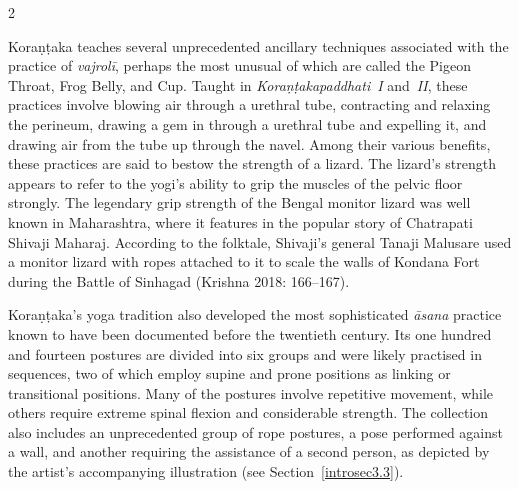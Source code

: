 \begin{nohyp}
\begin{multicols*}{2}
\begin{eng}
Koraṇṭaka teaches several unprecedented ancillary techniques associated with the practice of \emph{vajrolī}, perhaps the most unusual of which are called the Pigeon Throat, Frog Belly, and Cup. Taught in \emph{Koraṇṭakapaddhati}~\emph{I} and~\emph{II}, these practices involve blowing air through a urethral tube, contracting and relaxing the perineum, drawing a gem in through a urethral tube and expelling it, and drawing air from the tube up through the navel. Among their various benefits, these practices are said to bestow the strength of a lizard. The lizard's strength appears to refer to the yogi's ability to grip the muscles of the pelvic floor strongly. The legendary grip strength of the Bengal monitor lizard was well known in Maharashtra, where it features in the popular story of Chatrapati Shivaji Maharaj. According to the folktale, Shivaji's general Tanaji Malusare used a monitor lizard with ropes attached to it to scale the walls of Kondana Fort during the Battle of Sinhagad (Krishna 2018: 166--167).

Koraṇṭaka's yoga tradition also developed the most sophisticated \emph{āsana} practice known to have been documented before the twentieth century. Its one hundred and fourteen postures are divided into six groups and were likely practised in sequences, two of which employ supine and prone positions as linking or transitional positions. Many of the postures involve repetitive movement, while others require extreme spinal flexion and considerable strength. The collection also includes an unprecedented group of rope postures, a pose performed against a wall, and another requiring the assistance of a second person, as depicted by the artist's accompanying illustration (see Section~\ref{introsec3.3}).


\end{eng}
\end{multicols*}
\end{nohyp}

